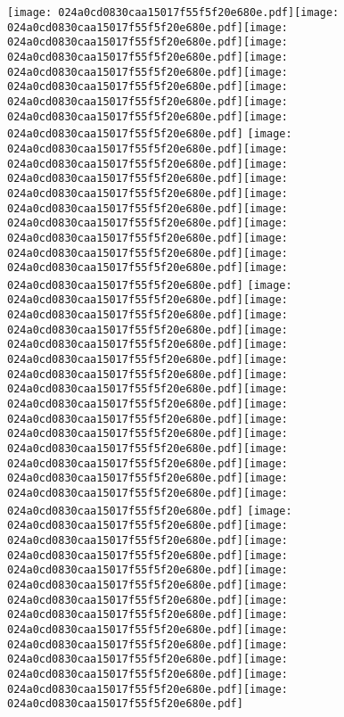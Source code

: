 \documentclass{article}
\newcommand{\origpg}[2]{\texttt{[image: 024a0cd0830caa15017f55f5f20e680e.pdf]}}
\begin{document}
{\vspace{19.995pt}\origpg{15}{85.303pt 510.85pt 96.956pt 526.99pt}\origpg{15}{96.859pt 510.85pt 105.07pt 526.99pt}\origpg{15}{105.07pt 510.85pt 113.14pt 526.99pt}\origpg{15}{113.23pt 510.85pt 120.39pt 526.99pt}\origpg{15}{120.44pt 510.85pt 128.66pt 526.99pt}\origpg{15}{128.66pt 510.85pt 136.73pt 526.99pt}\hspace{-0.387pt}\origpg{15}{136.34pt 510.85pt 143.39pt 526.99pt}\origpg{15}{143.33pt 510.85pt 151.17pt 526.99pt}\hspace{-0.371pt}\origpg{15}{53mm 510.85pt 157.97pt 526.99pt} \origpg{15}{162.1pt 510.85pt 170.73pt 526.99pt}\hspace{-0.21pt}\origpg{15}{170.52pt 510.85pt 179.16pt 526.99pt}\origpg{15}{179.16pt 510.85pt 189.62pt 526.99pt}\origpg{15}{189.55pt 510.85pt 197.62pt 526.99pt}\hspace{-0.113pt}\origpg{15}{197.51pt 510.85pt 205.58pt 526.99pt}\hspace{-0.113pt}\origpg{15}{205.47pt 510.85pt 215.68pt 526.99pt}\origpg{15}{215.59pt 510.85pt 222.75pt 526.99pt}\hspace{-0.178pt}\origpg{15}{222.58pt 510.85pt 231.21pt 526.99pt}\origpg{15}{231.21pt 510.85pt 239.85pt 526.99pt}\origpg{15}{239.91pt 510.85pt 248.55pt 526.99pt} \origpg{15}{252.42pt 510.85pt 260.49pt 526.99pt}\hspace{-0.113pt}\origpg{15}{260.38pt 510.85pt 267.54pt 526.99pt}\origpg{15}{267.59pt 510.85pt 274.76pt 526.99pt}\hspace{-0.178pt}\origpg{15}{274.58pt 510.85pt 283.22pt 526.99pt}\origpg{15}{283.22pt 510.85pt 291.29pt 526.99pt}\hspace{0.145pt}\origpg{15}{291.43pt 510.85pt 298.6pt 526.99pt}\hspace{-0.42pt}\origpg{15}{298.18pt 510.85pt 306.39pt 526.99pt}\origpg{15}{306.39pt 510.85pt 313.56pt 526.99pt}\hspace{-0.21pt}\origpg{15}{313.35pt 510.85pt 321.4pt 526.99pt}\origpg{15}{321.31pt 510.85pt 328.47pt 526.99pt}\origpg{15}{328.52pt 510.85pt 337.16pt 526.99pt}\origpg{15}{337.16pt 510.85pt 345.79pt 526.99pt}\origpg{15}{345.86pt 510.85pt 356.7pt 526.99pt}\origpg{15}{356.7pt 510.85pt 366.92pt 526.99pt}\origpg{15}{366.82pt 510.85pt 375.46pt 526.99pt} \origpg{15}{379.57pt 510.85pt 387.79pt 526.99pt}\hspace{-0.258pt}\origpg{15}{387.53pt 510.85pt 396.16pt 526.99pt}\origpg{15}{396.16pt 510.85pt 404.8pt 526.99pt}\hspace{-0.161pt}\origpg{15}{404.64pt 510.85pt 411.8pt 526.99pt}\origpg{15}{411.85pt 510.85pt 422.07pt 526.99pt}\origpg{15}{421.97pt 510.85pt 430.61pt 526.99pt}\origpg{15}{430.61pt 510.85pt 438.73pt 526.99pt}\origpg{15}{438.82pt 510.85pt 445.99pt 526.99pt}\hspace{0.291pt}\origpg{15}{446.28pt 510.85pt 453.45pt 526.99pt}\hspace{-0.178pt}\origpg{15}{453.27pt 510.85pt 461.11pt 526.99pt}\origpg{15}{461.21pt 510.85pt 469.85pt 526.99pt}\origpg{15}{469.85pt 510.85pt 480.06pt 526.99pt}\origpg{15}{480pt 510.85pt 488.63pt 526.99pt} 

}
\end{document}
